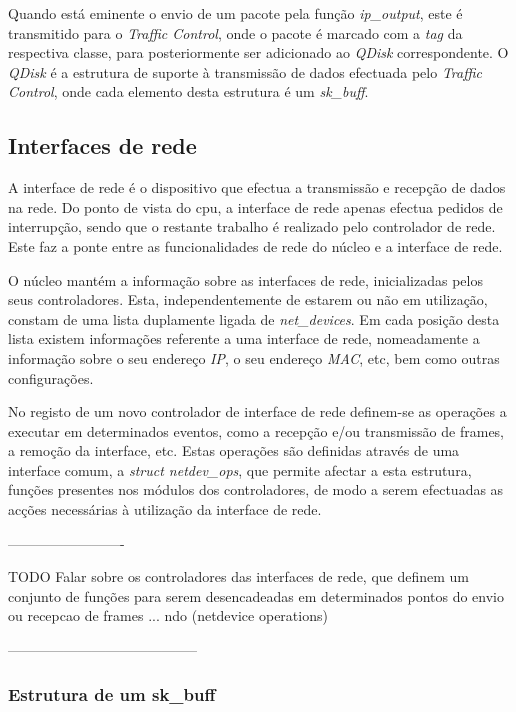 Quando está eminente o envio de um pacote pela função \textit{ip\_output}, este é transmitido para o \textit{Traffic Control}, onde o pacote é marcado com a \textit{tag} da respectiva classe, para posteriormente ser adicionado ao \textit{QDisk} correspondente.
O \textit{QDisk} é a estrutura de suporte à transmissão de dados efectuada pelo \textit{Traffic Control}, onde cada elemento desta estrutura é um \textit{sk\_buff}.


\subsection{Interfaces de rede}

A interface de rede é o dispositivo que efectua a transmissão e recepção de dados na rede.
Do ponto de vista do cpu, a interface de rede apenas efectua pedidos de interrupção, sendo que o restante trabalho é realizado pelo controlador de rede.
Este faz a ponte entre as funcionalidades de rede do núcleo e a interface de rede.

O núcleo mantém a informação sobre as interfaces de rede, inicializadas pelos seus controladores.
Esta, independentemente de estarem ou não em utilização, constam de uma lista duplamente ligada de \textit{net\_devices}.
Em cada posição desta lista existem informações referente a uma interface de rede, nomeadamente a informação sobre o seu endereço \textit{IP}, o seu endereço \textit{MAC}, etc, bem como outras configurações.

No registo de um novo controlador de interface de rede definem-se as operações a executar em determinados eventos, como a recepção e/ou transmissão de frames, a remoção da interface, etc.
Estas operações são definidas através de uma interface comum, a \textit{struct netdev\_ops}, que permite afectar a esta estrutura, funções presentes nos módulos dos controladores, de modo a serem efectuadas as acções necessárias à utilização da interface de rede.

-------------------------

TODO
Falar sobre os controladores das interfaces de rede, que definem um conjunto de funções para serem desencadeadas em determinados pontos do envio ou recepcao de frames ... ndo (netdevice operations) 
 
-----------------------------------------

\subsubsection{Estrutura de um sk\_buff}
\label{subsub:sk_buff}

